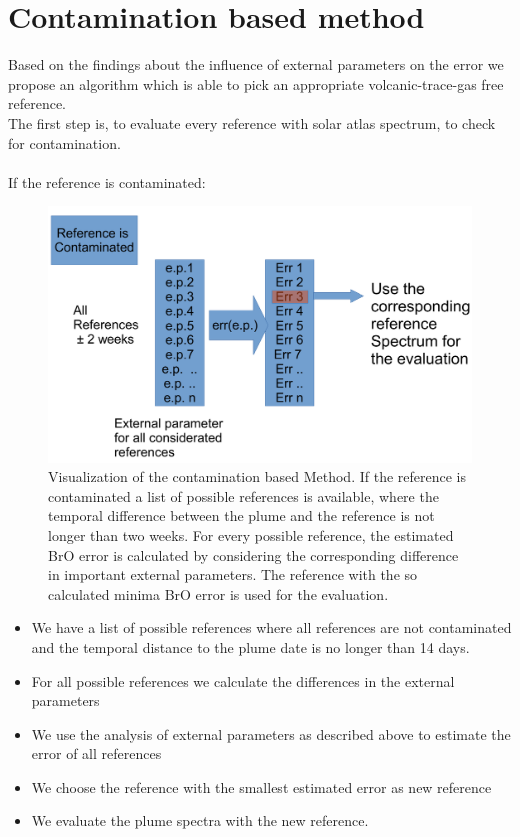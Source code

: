 \documentclass  [
  paper    = a4,
  BCOR     = 10mm,
  twoside,
  fontsize = 12pt,
  fleqn,
  toc      = bibnumbered,
  toc      = listofnumbered,
  numbers  = noendperiod,
  headings = normal,
  listof   = leveldown,
  version  = 3.03
]                                       {scrreprt}
\begin{document}
\chapter{Contamination based method \label{chapt:contbased}}
	Based on the findings about the influence of external parameters on the  error we propose an algorithm which is able to pick an appropriate volcanic-trace-gas free reference.\\ 
	The first step is, to evaluate every reference with solar atlas spectrum, to check for contamination.\\
	\\
	If the reference is contaminated:
	\begin{figure}
		\centering
		\includegraphics[width=0.7\linewidth]{Bilder/Cont}
		\caption{Visualization of the contamination based Method. If the reference is contaminated a list of possible references is available, where the temporal difference between the plume and the reference is not longer than two weeks. For every possible reference, the estimated BrO error is calculated by considering the corresponding difference in important external parameters. The reference with the so calculated minima BrO error is used for the evaluation.}
		\label{fig:Cont}
	\end{figure}

	\begin{itemize}
		\item We have a list of possible references where all references are not contaminated and the temporal distance to the plume date is no longer than 14 days.
		\item For all possible references we calculate the differences in the external parameters
		\item We use the analysis of external parameters as described above to estimate the  error of all references
		\item We choose the reference with the smallest estimated  error as new reference
		\item We evaluate the plume spectra with the new reference.
	\end{itemize}
\end{document}
